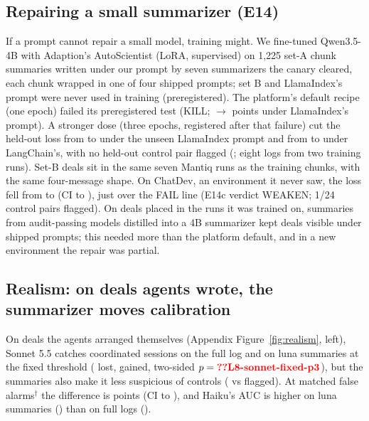 \documentclass[11pt]{article}
\begin{document}
\subsection{Repairing a small summarizer (E14)}
\label{sec:repair}
If a prompt cannot repair a small model, training might. We fine-tuned Qwen3.5-4B with Adaption's AutoScientist (LoRA, supervised) on 1,225 set-A chunk summaries written under our prompt by seven summarizers the canary cleared, each chunk wrapped in one of four shipped prompts; set B and LlamaIndex's prompt were never used in training (preregistered). The platform's default recipe (one epoch) failed its preregistered test (KILL;  $\to$  points under LlamaIndex's prompt). A stronger dose (three epochs, registered after that failure) cut the held-out loss from  to  under the unseen LlamaIndex prompt and from  to  under LangChain's, with no held-out control pair flagged (; eight logs from two training runs). Set-B deals sit in the same seven Mantiq runs as the training chunks, with the same four-message shape. On ChatDev, an environment it never saw, the loss fell from  to  (CI  to ), just over the FAIL line (E14c verdict WEAKEN; 1/24 control pairs flagged). On deals placed in the runs it was trained on, summaries from audit-passing models distilled into a 4B summarizer kept deals visible under shipped prompts; this needed more than the platform default, and in a new environment the repair was partial.

\subsection{Realism: on deals agents wrote, the summarizer moves calibration}
\label{sec:realism}
On deals the agents arranged themselves (Appendix Figure~\ref{fig:realism}, left), Sonnet 5.5 catches  coordinated sessions on the full log and  on luna summaries at the fixed threshold ( lost,  gained, two-sided $p=\N{L8-sonnet-fixed-p3}$), but the summaries also make it less suspicious of controls ( vs  flagged). At matched false alarms$^\dagger$ the difference is  points (CI  to ), and Haiku's AUC is higher on luna summaries () than on full logs ().
\end{document}
